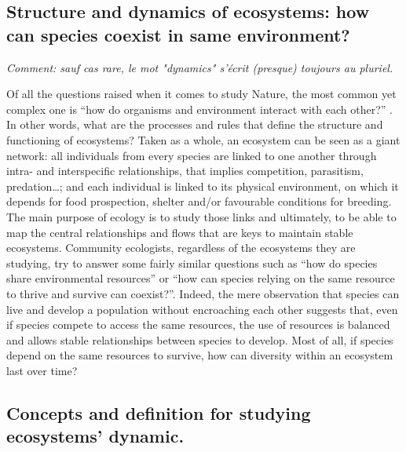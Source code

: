 

\subsection{Structure and dynamics of ecosystems: how can species coexist in same environment?} 

\emph{Comment: sauf cas rare, le mot "dynamics" s'écrit (presque) toujours au pluriel.}

Of all the questions raised when it comes to study Nature, the most common yet complex one is ``how do organisms and environment interact with each other?'' \citep{sutherland2013}. In other words, what are the processes and rules that define the structure and functioning of ecosystems? Taken as a whole, an ecosystem can be seen as a giant network: all individuals from every species are linked to one another through intra- and interspecific relationships, that implies competition, parasitism, predation\ldots{}; and each individual is linked to its physical environment, on which it depends for food prospection, shelter and/or favourable conditions for breeding. The main purpose of ecology is to study those links and ultimately, to be able to map the central relationships and flows that are keys to maintain stable ecosystems. Community ecologists, regardless of the ecosystems they are studying, try to answer some fairly similar questions such as ``how do species share environmental resources'' or ``how can species relying on the same resource to thrive and survive can coexist?''. Indeed, the mere observation that species can live and develop a population without encroaching each other suggests that, even if species compete to access the same resources, the use of resources is balanced and allows stable relationships between species to develop. Most of all, if species depend on the same resources to survive, how can diversity within an ecosystem last over time?

\subsection{Concepts and definition for studying ecosystems’ dynamic.}
 
